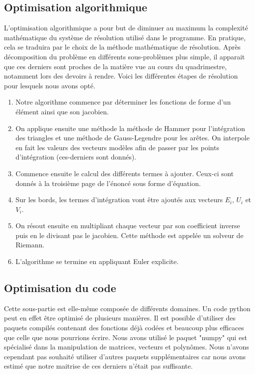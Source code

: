 \documentclass{article}
\begin{document}
	\subsection{Optimisation algorithmique}
		L'optimisation algorithmique a pour but de diminuer au maximum la complexité mathématique du système de résolution utilisé dans le programme.
		En pratique, cela se traduira par le choix de la méthode mathématique de résolution.
		Après décomposition du problème en différents sous-problèmes plus simple, il apparait que ces derniers sont proches de la matière vue au cours du quadrimestre, notamment lors des devoirs à rendre.
		Voici les différentes étapes de résolution pour lesquels nous avons opté.
		\begin{enumerate}
			\item 
				Notre algorithme commence par déterminer les fonctions de forme d'un élément ainsi que son jacobien.
			\item 
				On applique ensuite une méthode la méthode de Hammer pour l'intégration des triangles et une méthode de Gauss-Legendre pour les arêtes. 
				On interpole en fait les valeurs des vecteurs modèles afin de passer par les points d'intégration (ces-derniers sont donnés).
			\item 
				Commence ensuite le calcul des différents termes à ajouter.
				Ceux-ci sont donnés à la troisième page de l'énoncé sous forme d'équation.
			\item
				Sur les bords, les termes d'intégration vont être ajoutés aux vecteurs $E_i$, $U_i$ et $V_i$.
			\item 
				On résout ensuite en multipliant chaque vecteur par son coefficient inverse puis en le divisant pas le jacobien.
				Cette méthode est appelée un solveur de Riemann.
			\item 
				L'algorithme se termine en appliquant Euler explicite.
		\end{enumerate}
	\subsection{Optimisation du code}
		Cette sous-partie est elle-même composée de différents domaines.
		Un code python peut en effet être optimisé de plusieurs manières.
		Il est possible d'utiliser des paquets compilés contenant des fonctions déjà codées et beaucoup plus efficaces que celle que nous pourrions écrire.
		Nous avons utilisé le paquet "numpy" qui est spécialisé dans la manipulation de matrices, vecteurs et polynômes.
		Nous n'avons cependant pas souhaité utiliser d'autres paquets supplémentaires car nous avons estimé que notre maitrise de ces derniers n'était pas suffisante.
		
\end{document}
